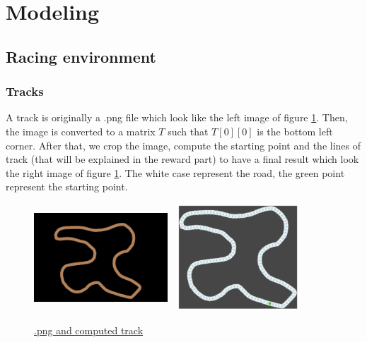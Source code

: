 \documentclass[11pt,a4paper]{article}
\newcounter{fig}
\begin{document}
	\section*{Modeling}
		\subsection*{Racing environment}
			\subsubsection*{Tracks}
A track is originally a .png file which look like the left image of figure \ref{figure:track}. Then, the image is converted to a matrix $T$ such that $T[0][0]$ is the bottom left corner. After that, we crop the image, compute the starting point and the lines of track (that will be explained in the reward part) to have a final result which look the right image of figure \ref{figure:track}. The white case represent the road, the green point represent the starting point.
\begin{center}
	\begin{figure}[ht]
		\centering
		\includegraphics[width=5cm, height=4cm]{track_06.png}
		\includegraphics[width=5cm, height=4cm]{track_06_computed.png}
		\caption{\underline{.png and computed track}}
		\label{figure:track}
	\end{figure}
\end{center}

	
\end{document}
